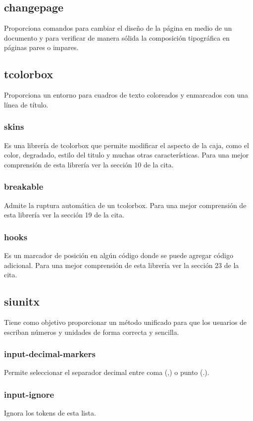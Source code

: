 \documentclass[12pt]{article}
\begin{document}
\subsection{changepage}
Proporciona comandos para cambiar el diseño de la página en medio de un documento y para verificar de manera sólida la composición tipográfica en páginas pares o impares.\cite{changepage}
\subsection{tcolorbox}
Proporciona un entorno para cuadros de texto coloreados y enmarcados con una línea de título.\cite{tcolorbox}
\subsubsection{skins}
Es una librería de tcolorbox que permite modificar el aspecto de la caja, como el color, degradado, estilo del titulo y muchas otras características. Para una mejor comprensión de esta librería ver la sección 10 de la cita.\cite{tcolorbox_lib}
\subsubsection{breakable}
Admite la ruptura automática de un tcolorbox. Para una mejor comprensión de esta librería ver la sección 19 de la cita. \cite{tcolorbox_lib}
\subsubsection{hooks}
Es un marcador de posición en algún código  donde se puede agregar código adicional. Para una mejor comprensión de esta librería ver la sección 23 de la cita. \cite{tcolorbox_lib}
\subsection{siunitx}
Tiene como objetivo proporcionar un método unificado para que los usuarios de  escriban números y unidades de forma correcta y sencilla.\cite{siunitx}
\subsubsection{input-decimal-markers}
Permite seleccionar el separador decimal entre coma (,) o punto (.).\cite{siunitx_param}
\subsubsection{input-ignore}
Ignora los tokens de esta lista.\cite{siunitx_param}
\end{document}
